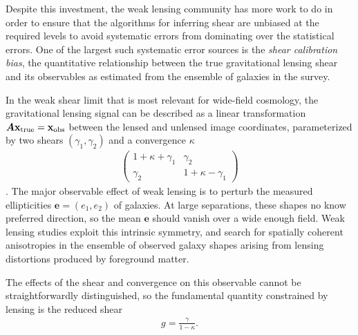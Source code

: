 \documentclass[iop]{emulateapj}
\begin{document}
Despite this investment, the weak lensing community has more work to
do in order to ensure that the algorithms for inferring shear are
unbiased at the required levels to avoid systematic errors from
dominating over the statistical errors. One of the largest such
systematic error sources is the {\it shear calibration bias}, the
quantitative relationship between the true gravitational lensing shear 
and its observables as estimated from the ensemble of galaxies in the survey.

In the weak shear limit that is most relevant for wide-field cosmology, the
gravitational lensing signal can be described as a linear
transformation
$\boldsymbol{A}\mathbf{x}_{\rm true} = \mathbf{x}_{\rm obs}$ between
the lensed and unlensed image coordinates, parameterized by two shears
$(\gamma_1,\gamma_2)$ and a convergence $\kappa$
\begin{align}
\begin{pmatrix}
1 + \kappa + \gamma_1 & \gamma_2 \\
\gamma_2 & 1 + \kappa - \gamma_1
\end{pmatrix}
\end{align}.
The major observable effect of weak lensing is to perturb the measured
ellipticities $\mathbf{e} = (e_1,e_2)$ of galaxies. At large
separations, these shapes no know preferred direction, so the mean
$\mathbf{e}$ should vanish over a wide enough field. Weak lensing
studies exploit this intrinsic symmetry, and search for spatially
coherent anisotropies in the ensemble of observed galaxy shapes
arising from lensing distortions produced by foreground matter.

The effects of the shear and convergence on this observable cannot be
straightforwardly distinguished, so the fundamental quantity
constrained by lensing is the reduced shear
\begin{align}
 g = \frac{\gamma}{1 - \kappa}.
\end{align}
\end{document}
